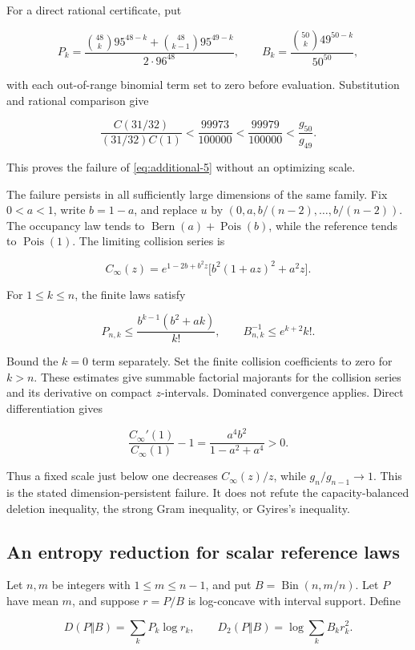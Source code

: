 For a direct rational certificate, put

\[
P_k=\frac{\binom{48}{k}95^{48-k}
+\binom{48}{k-1}95^{49-k}}{2\cdot96^{48}},\qquad
B_k=\frac{\binom{50}{k}49^{50-k}}{50^{50}},
\]

with each out-of-range binomial term set to zero before evaluation. Substitution and rational comparison give

\[
\frac{C(31/32)}{(31/32)C(1)}
<\frac{99973}{100000}<\frac{99979}{100000}
<\frac{g_{50}}{g_{49}}.
\]

This proves the failure of \eqref{eq:additional-5} without an optimizing scale.

The failure persists in all sufficiently large dimensions of the same family. Fix \(0<a<1\), write \(b=1-a\), and replace \(u\) by \((0,a,b/(n-2),\ldots,b/(n-2))\). The occupancy law tends to \(\operatorname{Bern}(a)+\operatorname{Pois}(b)\), while the reference tends to \(\operatorname{Pois}(1)\). The limiting collision series is

\[
C_\infty(z)=e^{1-2b+b^2z}\bigl[b^2(1+az)^2+a^2z\bigr].
\]

For \(1\le k\le n\), the finite laws satisfy

\[
P_{n,k}\le\frac{b^{k-1}(b^2+ak)}{k!},\qquad
B_{n,k}^{-1}\le e^{k+2}k!.
\]

Bound the \(k=0\) term separately. Set the finite collision coefficients to zero for \(k>n\). These estimates give summable factorial majorants for the collision series and its derivative on compact \(z\)-intervals. Dominated convergence applies. Direct differentiation gives

\[
\frac{C_\infty'(1)}{C_\infty(1)}-1
=\frac{a^4b^2}{1-a^2+a^4}>0.
\]

Thus a fixed scale just below one decreases \(C_\infty(z)/z\), while \(g_n/g_{n-1}\to1\). This is the stated dimension-persistent failure. It does not refute the capacity-balanced deletion inequality, the strong Gram inequality, or Gyires's inequality.

\subsection{An entropy reduction for scalar reference laws}\label{app:additional-20}

Let \(n,m\) be integers with \(1\le m\le n-1\), and put \(B=\operatorname{Bin}(n,m/n)\). Let \(P\) have mean \(m\), and suppose \(r=P/B\) is log-concave with interval support. Define

\[
D(P\Vert B)=\sum_kP_k\log r_k,\qquad
D_2(P\Vert B)=\log\sum_kB_kr_k^2.
\]

